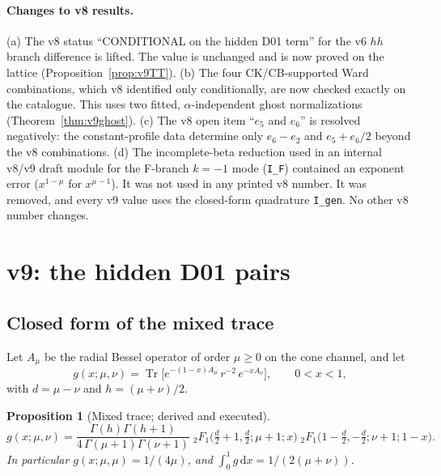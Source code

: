 \documentclass[11pt,a4paper]{article}
\newcommand{\dd}{\mathrm d}
\newcommand{\Tr}{\operatorname{Tr}}
\newcommand{\loc}[1]{\nolinkurl{#1}}
\newcommand{\CONDITIONAL}{\textsf{CONDITIONAL}}
\theoremstyle{plain}
\newtheorem{proposition}[theorem]{Proposition}
\theoremstyle{definition}
\theoremstyle{remark}
\numberwithin{equation}{section}
\begin{document}
\paragraph{Changes to v8 results.}
(a) The v8 status ``\CONDITIONAL{} on the hidden D01 term'' for the v6
\(hh\) branch difference is lifted. The value is unchanged and is
now proved on the lattice (Proposition~\ref{prop:v9TT}).
(b) The four CK/CB-supported Ward combinations, which v8
identified only conditionally, are now checked exactly on the
catalogue. This uses two fitted, \(\alpha\)-independent ghost
normalizations (Theorem~\ref{thm:v9ghost}).
(c) The v8 open item ``\(e_5\) and \(e_6\)'' is resolved negatively:
the constant-profile data determine only \(e_6-e_2\) and
\(e_5+e_6/2\) beyond the v8 combinations.
(d) The incomplete-beta reduction used in an internal v8/v9 draft
module for the F-branch \(k=-1\) mode (\loc{I_F}) contained an
exponent error (\(x^{1-\mu}\) for \(x^{\mu-1}\)). It was not used
in any printed v8 number. It was removed, and every v9 value uses
the closed-form quadrature \loc{I_gen}.
No other v8 number changes.

\section{v9: the hidden D01 pairs}
\label{sec:v9hidden}

\subsection{Closed form of the mixed trace}

Let \(A_\mu\) be the radial Bessel operator of order \(\mu\ge0\) on
the cone channel, and let
\[
 g(x;\mu,\nu)=\Tr\bigl[e^{-(1-x)A_\mu}\,r^{-2}\,e^{-xA_\nu}\bigr],
 \qquad 0<x<1,
\]
with \(d=\mu-\nu\) and \(h=(\mu+\nu)/2\).

\begin{proposition}[Mixed trace; derived and executed]
\label{prop:v9g}
\[
 g(x;\mu,\nu)=\frac{\Gamma(h)\Gamma(h+1)}{4\,\Gamma(\mu+1)\Gamma(\nu+1)}\;
 {}_2F_1\!\bigl(\tfrac d2+1,\tfrac d2;\mu+1;x\bigr)\;
 {}_2F_1\!\bigl(1-\tfrac d2,-\tfrac d2;\nu+1;1-x\bigr).
\]
In particular \(g(x;\mu,\mu)=1/(4\mu)\), and
\(\int_0^1g\,\dd x=1/(2(\mu+\nu))\).
\end{proposition}
\end{document}
